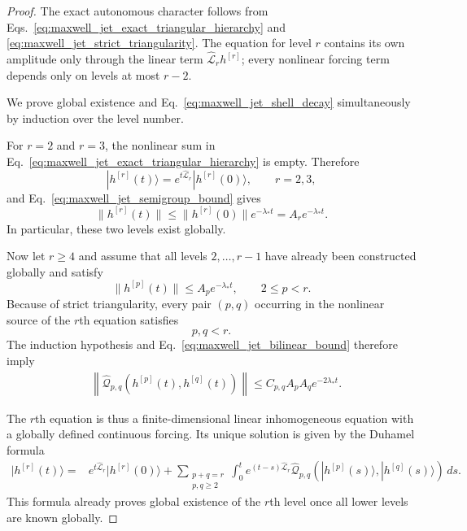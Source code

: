 \documentclass[11pt,oneside]{article}
\numberwithin{equation}{section}
\theoremstyle{definition}
\begin{document}
\begin{proof}

The exact autonomous character follows from
Eqs.~\eqref{eq:maxwell_jet_exact_triangular_hierarchy} and
\eqref{eq:maxwell_jet_strict_triangularity}.  The equation for level $r$
contains its own amplitude only through the linear term
$\widehat{\mathcal L}_rh^{[r]}$; every nonlinear forcing term depends only
on levels at most $r-2$.

We prove global existence and
Eq.~\eqref{eq:maxwell_jet_shell_decay} simultaneously by induction over
the level number.

For $r=2$ and $r=3$, the nonlinear sum in
Eq.~\eqref{eq:maxwell_jet_exact_triangular_hierarchy} is empty.  Therefore
\begin{equation}
|h^{[r]}(t)\rangle
=
e^{t\widehat{\mathcal L}_r}
|h^{[r]}(0)\rangle,
\qquad r=2,3,
\end{equation}
and Eq.~\eqref{eq:maxwell_jet_semigroup_bound} gives
\begin{equation}
\|h^{[r]}(t)\|
\leq
\|h^{[r]}(0)\|e^{-\lambda_*t}
=
A_re^{-\lambda_*t}.
\end{equation}
In particular, these two levels exist globally.

Now let $r\geq4$ and assume that all levels $2,\ldots,r-1$ have already
been constructed globally and satisfy
\begin{equation}
\|h^{[p]}(t)\|
\leq
A_pe^{-\lambda_*t},
\qquad
2\leq p<r.
\label{eq:maxwell_jet_induction_hypothesis}
\end{equation}
Because of strict triangularity, every pair $(p,q)$ occurring in the
nonlinear source of the $r$th equation satisfies
\begin{equation}
p,q<r.
\end{equation}
The induction hypothesis and
Eq.~\eqref{eq:maxwell_jet_bilinear_bound} therefore imply
\begin{align}
&
\left\|
\widehat{\mathcal Q}_{p,q}
\left(
h^{[p]}(t),h^{[q]}(t)
\right)
\right\|
\leq
C_{p,q}
A_pA_q
e^{-2\lambda_*t}.
\label{eq:maxwell_jet_source_decay}
\end{align}

The $r$th equation is thus a finite-dimensional linear inhomogeneous
equation with a globally defined continuous forcing.  Its unique solution
is given by the Duhamel formula
\begin{equation}
\begin{aligned}
|h^{[r]}(t)\rangle
={}&
e^{t\widehat{\mathcal L}_r}
|h^{[r]}(0)\rangle
+
\sum_{\substack{p+q=r\\p,q\geq2}}
\int_0^t
e^{(t-s)\widehat{\mathcal L}_r}
\widehat{\mathcal Q}_{p,q}
\left(
|h^{[p]}(s)\rangle,
|h^{[q]}(s)\rangle
\right)
\,ds .
\end{aligned}
\label{eq:maxwell_jet_duhamel}
\end{equation}
This formula already proves global existence of the $r$th level once all
lower levels are known globally.


\end{proof}
\end{document}
